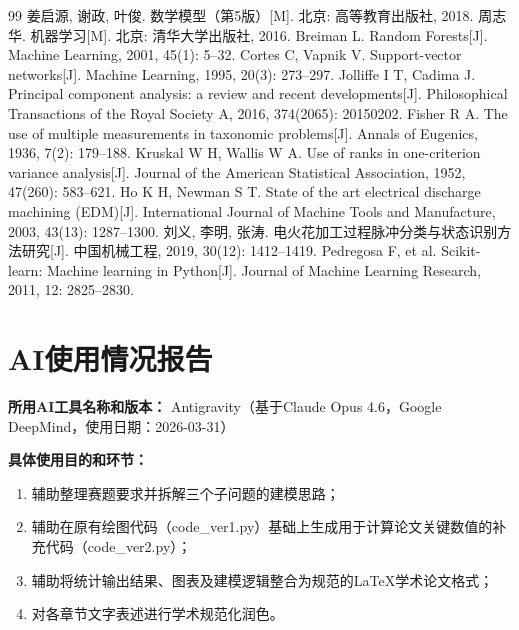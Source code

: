 \documentclass[UTF8,a4paper,12pt]{ctexart}
\begin{document}
\begin{thebibliography}{99}
 姜启源, 谢政, 叶俊. 数学模型（第5版）[M]. 北京: 高等教育出版社, 2018.
 周志华. 机器学习[M]. 北京: 清华大学出版社, 2016.
 Breiman L. Random Forests[J]. Machine Learning, 2001, 45(1): 5--32.
 Cortes C, Vapnik V. Support-vector networks[J]. Machine Learning, 1995, 20(3): 273--297.
 Jolliffe I T, Cadima J. Principal component analysis: a review and recent developments[J]. Philosophical Transactions of the Royal Society A, 2016, 374(2065): 20150202.
 Fisher R A. The use of multiple measurements in taxonomic problems[J]. Annals of Eugenics, 1936, 7(2): 179--188.
 Kruskal W H, Wallis W A. Use of ranks in one-criterion variance analysis[J]. Journal of the American Statistical Association, 1952, 47(260): 583--621.
 Ho K H, Newman S T. State of the art electrical discharge machining (EDM)[J]. International Journal of Machine Tools and Manufacture, 2003, 43(13): 1287--1300.
 刘义, 李明, 张涛. 电火花加工过程脉冲分类与状态识别方法研究[J]. 中国机械工程, 2019, 30(12): 1412--1419.
 Pedregosa F, et al. Scikit-learn: Machine learning in Python[J]. Journal of Machine Learning Research, 2011, 12: 2825--2830.
\end{thebibliography}

\section*{AI使用情况报告}

\noindent\textbf{所用AI工具名称和版本：}
Antigravity（基于Claude Opus 4.6，Google DeepMind，使用日期：2026-03-31）

\noindent\textbf{具体使用目的和环节：}
\begin{enumerate}[label=(\arabic*),leftmargin=2em]
\item 辅助整理赛题要求并拆解三个子问题的建模思路；
\item 辅助在原有绘图代码（code\_ver1.py）基础上生成用于计算论文关键数值的补充代码（code\_ver2.py）；
\item 辅助将统计输出结果、图表及建模逻辑整合为规范的LaTeX学术论文格式；
\item 对各章节文字表述进行学术规范化润色。
\end{enumerate}
\end{document}
